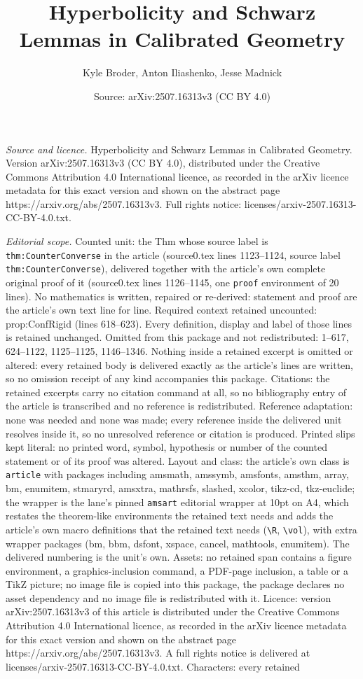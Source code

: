 \documentclass[10pt,a4paper]{amsart}
\title[Hyperbolicity and Schwarz Lemmas in Calibrated Geometry]{Hyperbolicity and Schwarz Lemmas in Calibrated Geometry}
\author{Kyle Broder, Anton Iliashenko, Jesse Madnick}
\date{Source: arXiv:2507.16313v3 (CC BY 4.0)}
\begin{document}
\maketitle

\noindent\emph{Source and licence.} Hyperbolicity and Schwarz Lemmas in Calibrated Geometry. Version arXiv:2507.16313v3 (CC BY 4.0), distributed under the Creative Commons Attribution 4.0 International licence, as recorded in the arXiv licence metadata for this exact version and shown on the abstract page https://arxiv.org/abs/2507.16313v3. Full rights notice: licenses/arxiv-2507.16313-CC-BY-4.0.txt.\par\smallskip

\noindent\textit{Editorial scope.} Counted unit: the Thm whose source label is \texttt{thm:CounterConverse} in the article (source0.tex lines 1123--1124, source label \texttt{thm:CounterConverse}), delivered together with the article's own complete original proof of it (source0.tex lines 1126--1145, one \texttt{proof} environment of 20 lines). No mathematics is written, repaired or re-derived: statement and proof are the article's own text line for line. Required context retained uncounted: prop:ConfRigid (lines 618--623). Every definition, display and label of those lines is retained unchanged. Omitted from this package and not redistributed: 1--617, 624--1122, 1125--1125, 1146--1346. Nothing inside a retained excerpt is omitted or altered: every retained body is delivered exactly as the article's lines are written, so no omission receipt of any kind accompanies this package. Citations: the retained excerpts carry no citation command at all, so no bibliography entry of the article is transcribed and no reference is redistributed. Reference adaptation: none was needed and none was made; every reference inside the delivered unit resolves inside it, so no unresolved reference or citation is produced. Printed slips kept literal: no printed word, symbol, hypothesis or number of the counted statement or of its proof was altered. Layout and class: the article's own class is \texttt{article} with packages including amsmath, amssymb, amsfonts, amsthm, array, bm, enumitem, stmaryrd, amsxtra, mathrsfs, slashed, xcolor, tikz-cd, tkz-euclide; the wrapper is the lane's pinned \texttt{amsart} editorial wrapper at 10pt on A4, which restates the theorem-like environments the retained text needs and adds the article's own macro definitions that the retained text needs (\texttt{\textbackslash R}, \texttt{\textbackslash vol}), with extra wrapper packages (bm, bbm, dsfont, xspace, cancel, mathtools, enumitem). The delivered numbering is the unit's own. Assets: no retained span contains a figure environment, a graphics-inclusion command, a PDF-page inclusion, a table or a TikZ picture; no image file is copied into this package, the package declares no asset dependency and no image file is redistributed with it. Licence: version arXiv:2507.16313v3 of this article is distributed under the Creative Commons Attribution 4.0 International licence, as recorded in the arXiv licence metadata for this exact version and shown on the abstract page https://arxiv.org/abs/2507.16313v3. A full rights notice is delivered at licenses/arxiv-2507.16313-CC-BY-4.0.txt. Characters: every retained 
\end{document}

